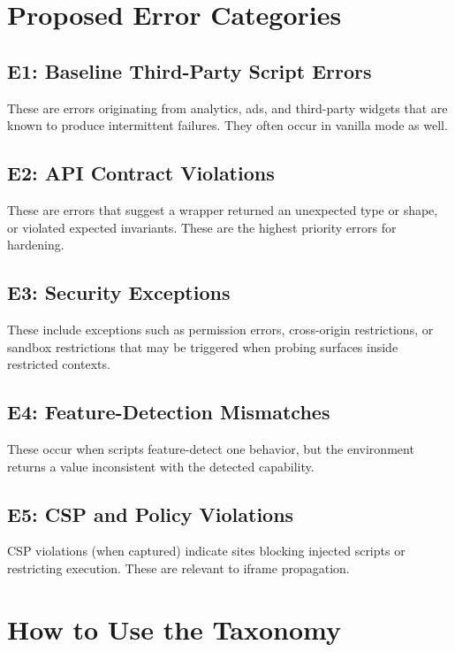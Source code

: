 \documentclass[11pt]{report}
\begin{document}
\section{Proposed Error Categories}

\subsection{E1: Baseline Third-Party Script Errors}

These are errors originating from analytics, ads, and third-party widgets that are known to produce intermittent failures. They often occur in vanilla mode as well.

\subsection{E2: API Contract Violations}

These are errors that suggest a wrapper returned an unexpected type or shape, or violated expected invariants. These are the highest priority errors for hardening.

\subsection{E3: Security Exceptions}

These include exceptions such as permission errors, cross-origin restrictions, or sandbox restrictions that may be triggered when probing surfaces inside restricted contexts.

\subsection{E4: Feature-Detection Mismatches}

These occur when scripts feature-detect one behavior, but the environment returns a value inconsistent with the detected capability.

\subsection{E5: CSP and Policy Violations}

CSP violations (when captured) indicate sites blocking injected scripts or restricting execution. These are relevant to iframe propagation.

\section{How to Use the Taxonomy}
\end{document}
